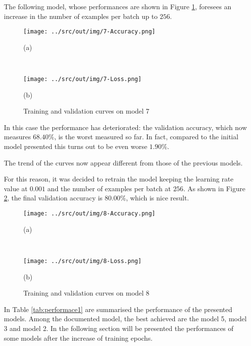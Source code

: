 \documentclass[a4paper,12pt]{article} %
\begin{document}
	The following model, whose performances are shown in Figure 
	\ref{fig:model7-performance}, foresees an increase in the number of 
	examples per batch up to $256$.
	
	\begin{figure}[H]
		\begin{minipage}[c]{.49\textwidth}
			\centering
			\texttt{[image: ../src/out/img/7-Accuracy.png]}
			\caption*{(a)}
		\end{minipage}
		~
		\begin{minipage}[c]{.49\textwidth}
			\centering
			\texttt{[image: ../src/out/img/7-Loss.png]}
			\caption*{(b)}
		\end{minipage}
		\caption{Training and validation curves on model 7}
		\label{fig:model7-performance}
	\end{figure}
	In this case the performance has deteriorated: the validation accuracy, 
	which now measures $68.40\%$, is the worst measured so far. In fact, 
	compared to the initial model presented this turns out to be even worse 
	$1.90\%$. 
	
	The trend of the curves now appear different from those of the previous 
	models.
	\newline
	
	For this reason, it was decided to retrain the model keeping the learning 
	rate value at $0.001$ and the number of examples per batch at $256$.
	As shown in Figure \ref{fig:model8-performance}, the final validation 
	accuracy is $80.00\%$, which is nice result.
	\newline
	
	\begin{figure}[htb]
		\begin{minipage}[c]{.49\textwidth}
			\centering
			\texttt{[image: ../src/out/img/8-Accuracy.png]}
			\caption*{(a)}
		\end{minipage}
		~
		\begin{minipage}[c]{.49\textwidth}
			\centering
			\texttt{[image: ../src/out/img/8-Loss.png]}
			\caption*{(b)}
		\end{minipage}
		\caption{Training and validation curves on model 8}
		\label{fig:model8-performance}
	\end{figure}

	In Table \ref{tab:performace1} are summarised the performance of the 
	presented models. Among the documented model, the best achieved are the 
	model 5, model 3 and model 2. 
	In the following section will be presented the performances of some 
	models after the increase of training epochs.
	
\end{document}
